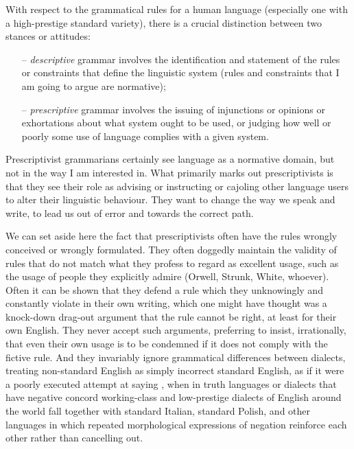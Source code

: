 \documentclass[output=paper]{langscibook}
\begin{document}
With respect to the grammatical rules for a human language (especially one with a high-prestige standard variety), there is a crucial distinction between two stances or attitudes:

\begin{itemize} 
\item[–] \emph{descriptive} grammar involves the identification and statement of the rules or constraints that define the linguistic system (rules and constraints that I am going to argue are normative); 
\item[–] \emph{prescriptive} grammar involves the issuing of injunctions or opinions or exhortations about what system ought to be used, or judging how well or poorly some use of language complies with a given system. 
\end{itemize} 

Prescriptivist grammarians certainly see language as a normative domain, but not in the way I am interested in. What primarily marks out prescriptivists is that they see their role as advising or instructing or cajoling other language users to alter their linguistic behaviour.  They want to change the way we speak and write, to lead us out of error and towards the correct path.

We can set aside here the fact that prescriptivists often have the rules wrongly conceived or wrongly formulated.  They often doggedly maintain the validity of rules that do not match what they profess to regard as excellent usage, such as the usage of people they explicitly admire (Orwell, Strunk, White, whoever).  Often it can be shown that they defend a rule which they unknowingly and constantly violate in their own writing, which one might have thought was a knock-down drag-out argument that the rule cannot be right, at least for their own English.  They never accept such arguments, preferring to insist, irrationally, that even their own usage is to be condemned if it does not comply with the fictive rule. And they invariably ignore grammatical differences between dialects, treating non-standard English  as simply incorrect standard English, as if it were a poorly executed attempt at saying , when in truth languages or dialects that have negative concord working-class and low-prestige dialects of English around the world fall together with standard Italian, standard Polish, and other languages in which repeated morphological expressions of negation reinforce each other rather than cancelling out.
\end{document}
